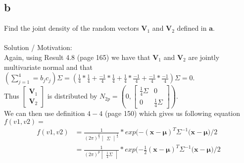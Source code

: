 \documentclass{article}
\begin{document}
\subsection{b}
Find the joint density of the random vectors $\boldsymbol{V}_1$ and $\boldsymbol{V}_2$ defined in $\boldsymbol{a}$. \\ \\
Solution / Motivation: \\
Again, using Result 4.8 (page 165) we have that $\boldsymbol{V}_1$ and $\boldsymbol{V}_2$ are jointly multivariate normal and that $(\sum_{j=1}^{4} = b_{j}c_{j})\Sigma = (\frac{1}{4}*\frac{1}{4}+\frac{-1}{4}*\frac{1}{4}+\frac{1}{4}*\frac{-1}{4}+\frac{-1}{4}*\frac{-1}{4})\Sigma = 0$. \\
Thus $
    \begin{bmatrix}
    \boldsymbol{V}_1 \\
    \boldsymbol{V}_2
    \end{bmatrix}$ is distributed by $N_{2p} = (0,
    \begin{bmatrix}
    \frac{1}{4}\Sigma & 0 \\
    0 & \frac{1}{4}\Sigma
    \end{bmatrix})$. \\
    We can then use definition $4-4$ (page 150) which gives us following equation \\
    $f(v1, v2) = $
    \begin{equation*}
\begin{split}
f(v1, v2) & = \frac{1}{(2\pi)^{\frac{p}{2}}\begin{vmatrix}
\Sigma
\end{vmatrix}^{\frac{1}{2}}} * exp(-(\boldsymbol{x}-\boldsymbol{\mu})^{T}\Sigma^{-1}({\boldsymbol{x} - \boldsymbol{\mu})/2} \\
 & = \frac{1}{(2\pi)^{p}\begin{vmatrix}
\frac{1}{4}\Sigma
\end{vmatrix}} * exp(-\frac{1}{2}(\boldsymbol{x}-\boldsymbol{\mu})^{T}\Sigma^{-1}({\boldsymbol{x} - \boldsymbol{\mu})/2}
\end{split}
\end{equation*}
\end{document}
